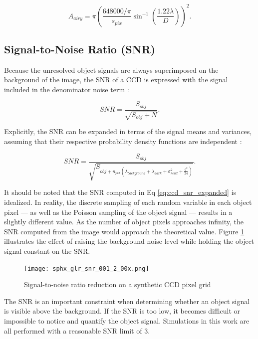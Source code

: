 \begin{equation} \label{eq:airy_area}
  A_{airy} = \pi \left(\frac{648000 / \pi}{s_{pix}} \sin^{-1}\left(\frac{1.22 \lambda}{D}\right) \right)^2.
\end{equation}

\subsection{Signal-to-Noise Ratio (SNR)}

Because the unresolved object signals are always superimposed on the background of the image, the SNR of a CCD is expressed with the signal included in the denominator noise term \cite{frueh2019notes}:

\begin{equation} \label{eq:ccd_snr}
  SNR = \frac{S_{obj}}{\sqrt{S_{obj}+N}}.
\end{equation}

Explicitly, the SNR can be expanded in terms of the signal means and variances, assuming that their respective probability density functions are independent \cite{frueh2019notes}:

\begin{equation} \label{eq:ccd_snr_expanded}
  SNR = \frac{S_{obj}}{\sqrt{S_{obj + n_{pix} \left( \lambda_{background} + \lambda_{dark} + \sigma^2_{read} + \frac{g^2}{24} \right)}}}.
\end{equation}

It should be noted that the SNR computed in Eq \ref{eq:ccd_snr_expanded} is idealized. In reality, the discrete sampling of each random variable in each object pixel --- as well as the Poisson sampling of the object signal --- results in a slightly different value. As the number of object pixels approaches infinity, the SNR computed from the image would approach the theoretical value. Figure \ref{fig:snr_grid} illustrates the effect of raising the background noise level while holding the object signal constant on the SNR.

\begin{figure}[ht]
  \centering
  \texttt{[image: sphx\_glr\_snr\_001\_2\_00x.png]}
  \caption{Signal-to-noise ratio reduction on a synthetic CCD pixel grid}
  \label{fig:snr_grid}
\end{figure}

The SNR is an important constraint when determining whether an object signal is visible above the background. If the SNR is too low, it becomes difficult or impossible to notice and quantify the object signal. Simulations in this work are all performed with a reasonable SNR limit of $3$.

